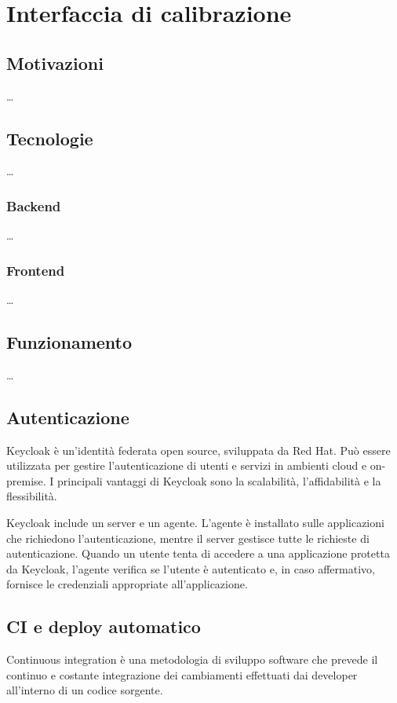 \chapter{Interfaccia di calibrazione}\label{ch:interfaccia}

\section{Motivazioni}\label{sec:motivazioni}
\ldots

\section{Tecnologie}\label{sec:tecnologie}
\ldots

\subsection{Backend}\label{ssec:interfaccia-backend}
\ldots

\subsection{Frontend}\label{ssec:interfaccia-frontend}
\ldots

\section{Funzionamento}\label{sec:funzionamento}
\ldots

\section{Autenticazione}\label{sec:autenticazione}
Keycloak è un'identità federata open source, sviluppata da Red Hat. Può essere utilizzata per gestire l'autenticazione di utenti e servizi in ambienti cloud e on-premise. I principali vantaggi di Keycloak sono la scalabilità, l'affidabilità e la flessibilità.

Keycloak include un server e un agente. L'agente è installato sulle applicazioni che richiedono l'autenticazione, mentre il server gestisce tutte le richieste di autenticazione. Quando un utente tenta di accedere a una applicazione protetta da Keycloak, l'agente verifica se l'utente è autenticato e, in caso affermativo, fornisce le credenziali appropriate all'applicazione.

\section{CI e deploy automatico}\label{sec:ci}
Continuous integration è una metodologia di sviluppo software che prevede il continuo e costante integrazione dei cambiamenti effettuati dai developer all'interno di un codice sorgente.

